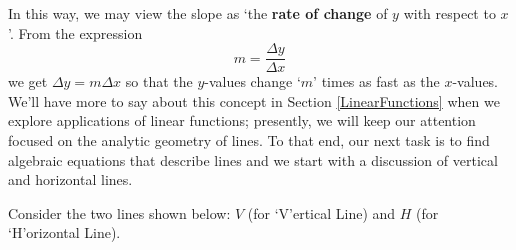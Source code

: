 \documentclass{ximera}
\begin{document}
\begin{center}
\end{center}

In this way, we may view the slope as  `the \textbf{rate of change} of $y$ with respect to $x$'.  From the expression \[ m = \frac{\Delta y}{\Delta x}\] we get $\Delta y = m \Delta x$ so that the $y$-values change `$m$' times as fast as the $x$-values.  We'll have more to say about this concept in Section \ref{LinearFunctions} when we explore applications of linear functions;  presently, we will keep our attention focused on the analytic geometry of lines.  To that end, our next task is to find algebraic equations that describe lines and we start with a discussion of vertical and horizontal lines.


Consider the two lines shown below: $V$ (for `V'ertical Line) and $H$ (for `H'orizontal Line).    
\end{document}
